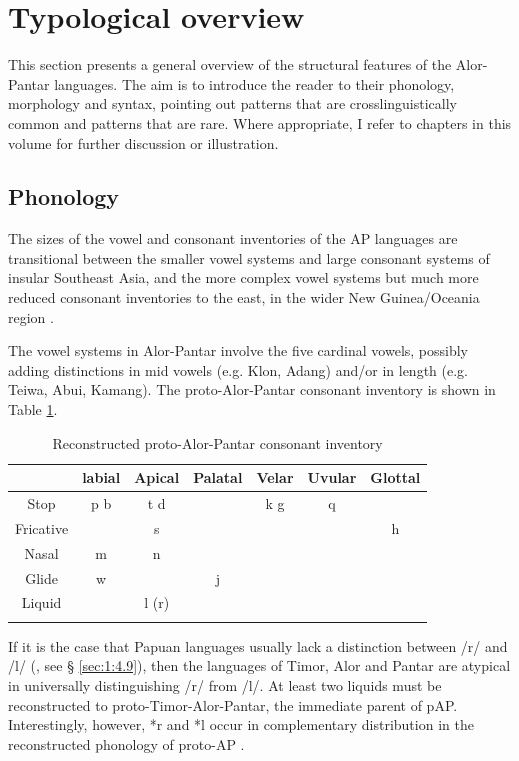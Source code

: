 \section{Typological overview}\label{sec:1:5}

This section presents a general overview of the structural features of the Alor-Pantar languages. The aim is to introduce the reader to their phonology, morphology and syntax, pointing out patterns that are crosslinguistically common and patterns that are rare. Where appropriate, I refer to chapters in this volume for further discussion or illustration. 

\subsection{Phonology}\label{sec:1:5.1}
The sizes of the vowel and consonant inventories of the AP languages are transitional between the smaller vowel systems and large consonant systems of insular Southeast Asia, and the more complex vowel systems but much more reduced consonant inventories to the east, in the wider New Guinea/Oceania region \citep[cf.][]{Hajek2010}.

The vowel systems in Alor-Pantar involve the five cardinal vowels, possibly adding distinctions in mid vowels (e.g. Klon, Adang) and/or in length (e.g. Teiwa, Abui, Kamang). The proto-Alor-Pantar consonant inventory \citep{HoltonEtAl2012,HoltonEtAlthisvolumea} is shown in Table \ref{tab:1:3}.



\begin{table}\centering 
\begin{tabular}{ccccccc} 
\mytoprule
& {labial} & {Apical} & {Palatal} & {Velar} & {Uvular} & {Glottal}\\
\midrule 
{Stop} & {p  b} & {t  d} &  & {k  g} & {q} & \\
{Fricative} &  & {s} &  &  &  & {h}\\
{Nasal} & {m} & {n} &  &  &  & \\
{Glide} & {w} &  & {j} &  &  & \\
{Liquid} &  & {l (r)} &  &  &  & \\
\mybottomrule
\end{tabular}
\caption{Reconstructed proto-Alor-Pantar consonant inventory}
\label{tab:1:3}
\end{table}

If it is the case that Papuan languages usually lack a distinction between /r/ and /l/ (\citealt{Foley1986}, see {\S} \ref{sec:1:4.9}), then the languages of Timor, Alor and Pantar are atypical in universally distinguishing /r/ from /l/. At least two liquids must be reconstructed to proto-Timor-Alor-Pantar, the immediate parent of pAP. Interestingly, however, *r and *l occur in complementary distribution in the reconstructed phonology of proto-AP \citep{HoltonEtAl2012}. 

